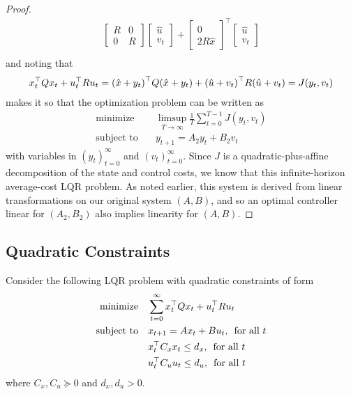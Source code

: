 \documentclass[12pt]{article}
\begin{document}
\begin{proof}
\begin{align*}
          \begin{bmatrix} R & 0 \\ 0 & R \end{bmatrix}
          \begin{bmatrix} \hat{u} \\ v_t \end{bmatrix}
        + \begin{bmatrix} 0 \\ 2 R \hat{x} \end{bmatrix}^\top
          \begin{bmatrix} \hat{u} \\ v_t \end{bmatrix} \\
  \end{align*}
  and noting that
  \begin{align*}
    x_t ^\top Q x_t + u_t ^\top R u_t
      = {\left(\hat{x} + y_t\right)}^\top Q {\left(\hat{x} + y_t\right)}
        + {\left(\hat{u} + v_t\right)}^\top R {\left(\hat{u} + v_t\right)}
      = J(y_t, v_t)
  \end{align*}
  makes it so that the optimization problem can be written as
  \begin{align*}
    \text{minimize}
      &\quad
        \limsup_{T \to \infty} \frac{1}{T} \sum_{t = 0}^{T - 1}
          J(y_t, v_t) \\
    \text{subject to}
      &\quad y_{t + 1} = A_2 y_t + B_2 v_t
  \end{align*}
  with variables in \((y_t)_{t = 0}^{\infty}\) and \((v_t)_{t = 0}^{\infty}\).
  Since \(J\) is a quadratic-plus-affine decomposition of the
  state and control costs,
  we know that this infinite-horizon average-cost LQR problem.
  As noted earlier,
  this system is derived from linear transformations on our original
  system \((A, B)\), and so an optimal controller linear for \((A_2, B_2)\)
  also implies linearity for \((A, B)\).

\end{proof}


\subsection{Quadratic Constraints}
Consider the following LQR problem with quadratic constraints of form
\begin{align}
  \text{minimize} &\quad \sum_{t = 0}^{\infty}
    x_t ^\top Q x_t + u_t ^\top R u_t
    \label{eqn:quad-lqr} \\
  \text{subject to}
    &\quad x_{t + 1} = A x_t + B u_t, \enskip \text{for all \(t\)} \\
    &\quad x_t ^\top C_x x_t \leq d_x, \enskip \text{for all \(t\)} \\
    &\quad u_t ^\top C_u u_t \leq d_u, \enskip \text{for all \(t\)}
\end{align}
where \(C_x, C_u \succeq 0\) and \(d_x, d_u > 0\).
\end{document}

